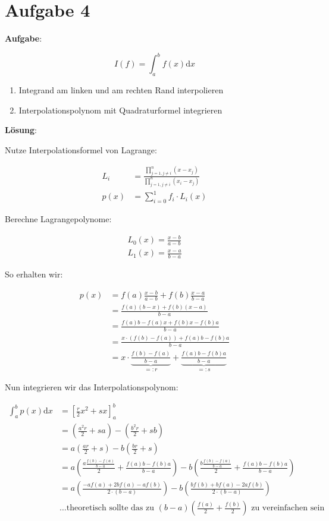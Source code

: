 \section*{Aufgabe 4}
\textbf{Aufgabe}: 

\[I(f) = \int_a^b f(x) \mathrm{d}x \]

\begin{enumerate}
    \item Integrand am linken und am rechten Rand interpolieren
	\item Interpolationspolynom mit Quadraturformel integrieren
\end{enumerate}

\textbf{Lösung}:

Nutze Interpolationsformel von Lagrange:

\begin{align}
    L_i &= \frac{\prod_{j=1, j \neq i}^n (x-x_j)}{\prod_{j=1, j \neq i}^n (x_i - x_j)}\\
    p(x) &= \sum_{i=0}^{1} f_i \cdot L_i(x)
\end{align}

Berechne Lagrangepolynome:

\begin{align}
    L_0(x) = \frac{x-b}{a-b} \\
    L_1(x) = \frac{x-a}{b-a}
\end{align}

So erhalten wir:

\begin{align}
    p(x) &= f(a) \frac{x-b}{a-b} + f(b) \frac{x-a}{b-a}\\
    &= \frac{f(a) (b-x) + f(b) (x-a)}{b-a} \\
    &= \frac{f(a)b- f(a)x + f(b) x- f(b)a}{b-a}\\
    &=\frac{x \cdot \left (f(b)-f(a) \right  ) + f(a)b- f(b)a}{b-a}\\
    &= x \cdot \underbrace{\frac{f(b)-f(a)}{b-a}}_{=:r} + \underbrace{\frac{f(a)b - f(b)a}{b-a}}_{=: s}
\end{align}

Nun integrieren wir das Interpolationspolynom:

\begin{align}
    \int_a^b p(x) \mathrm{d} x &= \left [\frac{r}{2} x^2 +  sx \right ]_a^b\\
    &= \left (\frac{a^2 r}{2} + sa \right ) - \left (\frac{b^2 r}{2} + sb \right )\\
    &= a\left (\frac{a r}{2} + s \right ) - b \left (\frac{b r}{2} + s \right )\\
    &= a\left (\frac{a \frac{f(b)-f(a)}{b-a}}{2} + \frac{f(a)b - f(b)a}{b-a} \right ) - b \left (\frac{b \frac{f(b)-f(a)}{b-a}}{2} + \frac{f(a)b - f(b)a}{b-a} \right )\\
    &= a\left (\frac{-a f(a)+2b f(a)-a f(b)}{2 \cdot(b-a)}\right ) - b \left (\frac{bf(b) + b f(a) - 2 a f(b)}{2 \cdot (b-a)} \right )\\
    & \dots \text{theoretisch sollte das zu } (b-a)(\frac{f(a)}{2} + \frac{f(b)}{2}) \text{ zu vereinfachen sein}
\end{align}

